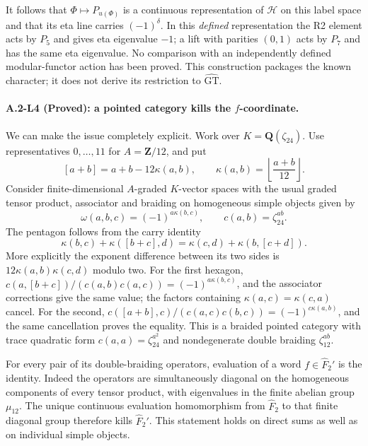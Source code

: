 It follows that $\Phi\mapsto P_{u(\Phi)}$ is a continuous
representation of $\mathcal H$ on this label space and that its eta
line carries $(-1)^\delta$.  In this \emph{defined} representation
the R2 element acts by $P_5$ and gives eta eigenvalue $-1$; a lift
with parities $(0,1)$ acts by $P_7$ and has the same eta eigenvalue.
No comparison with an independently defined modular-functor action
has been proved.  This construction packages the known character;
it does not derive its restriction to $\widehat{\mathrm{GT}}$.

\paragraph{A.2-L4 (Proved): a pointed category kills the $f$-coordinate.}
We can make the issue completely explicit.  Work over
$K=\mathbf Q(\zeta_{24})$.  Use representatives $0,\ldots,11$
for $A=\mathbf Z/12$, and put
\[
 [a+b]=a+b-12\kappa(a,b),\qquad
 \kappa(a,b)=\left\lfloor\frac{a+b}{12}\right\rfloor.
\]
Consider finite-dimensional $A$-graded $K$-vector spaces with the
usual graded tensor product, associator and braiding on homogeneous
simple objects given by
\[
 \omega(a,b,c)=(-1)^{a\kappa(b,c)},\qquad
 c(a,b)=\zeta_{24}^{ab}.
\]
The pentagon follows from the carry identity
\[
 \kappa(b,c)+\kappa([b+c],d)
 =\kappa(c,d)+\kappa(b,[c+d]).
\]
More explicitly the exponent difference between its two sides is
$12\kappa(a,b)\kappa(c,d)$ modulo two.  For the first hexagon,
$c(a,[b+c])/(c(a,b)c(a,c))=(-1)^{a\kappa(b,c)}$,
and the associator corrections give the same value; the factors
containing $\kappa(a,c)=\kappa(c,a)$ cancel.  For the second,
$c([a+b],c)/(c(a,c)c(b,c))=(-1)^{c\kappa(a,b)}$,
and the same cancellation proves the equality.  This is a braided
pointed category with trace quadratic form
$c(a,a)=\zeta_{24}^{a^2}$ and nondegenerate double braiding
$\zeta_{12}^{ab}$.

For every pair of its double-braiding operators, evaluation of a
word $f\in\widehat F_2'$ is the identity.  Indeed the operators
are simultaneously diagonal on the homogeneous components of every
tensor product, with eigenvalues in the finite abelian group
$\mu_{12}$.  The unique continuous evaluation homomorphism from
$\widehat F_2$ to that finite diagonal group therefore kills
$\widehat F_2'$.  This statement holds on direct sums as well as
on individual simple objects.

